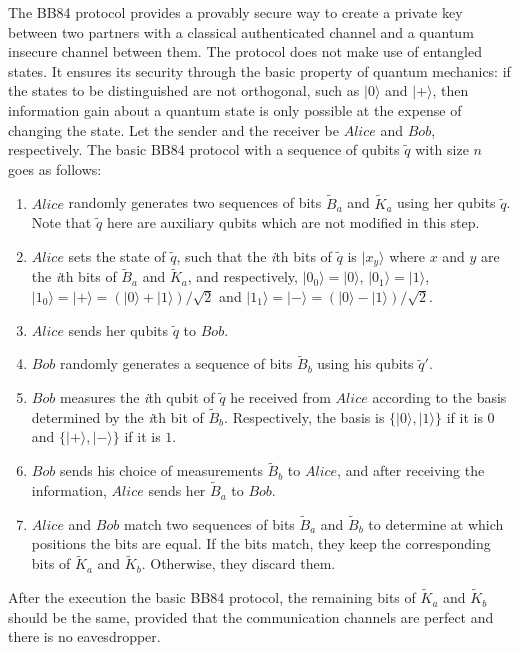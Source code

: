 \documentclass[a4paper,runningheads]{llncs}
\begin{document}

The BB84 protocol provides a provably secure way to create a private key between two partners with a classical authenticated channel and a quantum insecure
channel between them. The protocol does not make use of entangled states. It ensures its security through the basic property of quantum mechanics: if the states to be distinguished are not orthogonal, such as $|0\rangle$ and $|+\rangle$, then information gain about a quantum state is only possible at the expense of changing the state. Let the sender and the receiver be $Alice$ and $Bob$, respectively. The basic BB84 protocol with a sequence of qubits $\tilde{q}$ with size $n$ goes as follows:
\begin{enumerate}
	\item $Alice$ randomly generates two sequences of bits $\tilde{B}_a$ and $\tilde{K}_a$ using her qubits $\tilde{q}$. Note that $\tilde{q}$ here are auxiliary qubits which are not modified in this step.
	\item $Alice$ sets the state of $\tilde{q}$, such that the \textit{i}th bits of $\tilde{q}$ is $|x_{y}\rangle$ where $x$ and $y$ are the \textit{i}th bits of $\tilde{B}_a$ and $\tilde{K}_a$, and respectively,  $|0_0\rangle=|0\rangle$, $|0_1\rangle=|1\rangle$, $|1_0\rangle=|+\rangle=(|0\rangle+|1\rangle)/\sqrt{2}$ and $|1_1\rangle=|-\rangle=(|0\rangle-|1\rangle)/\sqrt{2}$.
	\item $Alice$ sends her qubits $\tilde{q}$ to $Bob$.
	\item $Bob$ randomly generates a sequence of bits $\tilde{B}_b$ using his qubits $\tilde{q}'$.
	\item $Bob$ measures the \textit{i}th qubit of $\tilde{q}$ he received from $Alice$ according to the basis determined by the \textit{i}th bit of $\tilde{B}_b$. Respectively, the basis is $\{|0\rangle,|1\rangle\}$ if it is $0$ and $\{|+\rangle,|-\rangle\}$ if it is $1$.
	\item $Bob$ sends his choice of measurements $\tilde{B}_{b}$ to $Alice$, and after receiving the information, $Alice$ sends her $\tilde{B}_{a}$ to $Bob$.
	\item $Alice$ and $Bob$ match two sequences of bits $\tilde{B}_{a}$ and $\tilde{B}_{b}$ to determine at which positions the bits are equal. If the bits match, they keep the corresponding bits of $\tilde{K}_a$ and $\tilde{K}_b$. Otherwise, they discard them.
\end{enumerate}
After the execution the basic BB84 protocol, the remaining bits of $\tilde{K}_a$ and $\tilde{K}_b$ should be the same, provided that the communication channels are perfect and there is no eavesdropper.
\end{document}
